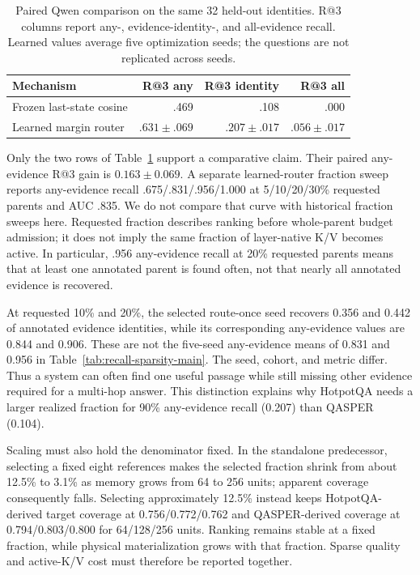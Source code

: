 \documentclass[11pt]{article}
\begin{document}
\begin{table}[H]
\centering
\small
\caption{Paired Qwen comparison on the same 32 held-out identities. R@3 columns report any-,
evidence-identity-, and all-evidence recall. Learned values average five optimization seeds;
the questions are not replicated across seeds.}
\label{tab:matched-routing-main}
\begin{tabular}{lrrr}
\toprule
Mechanism & R@3 any & R@3 identity & R@3 all \\
\midrule
Frozen last-state cosine & .469 & .108 & .000 \\
Learned margin router & $.631\pm.069$ & $.207\pm.017$ & $.056\pm.017$ \\
\bottomrule
\end{tabular}
\end{table}

Only the two rows of Table~\ref{tab:matched-routing-main} support a comparative claim. Their paired
any-evidence R@3 gain is $0.163\pm0.069$. A separate learned-router fraction sweep reports
any-evidence recall .675/.831/.956/1.000 at 5/10/20/30\% requested parents and AUC .835. We do not
compare that curve with historical fraction sweeps here. Requested fraction describes ranking
before whole-parent budget admission; it does not imply the same fraction of layer-native K/V
becomes active. In particular, .956 any-evidence recall at 20\% requested parents means that at
least one annotated parent is found often, not that nearly all annotated evidence is recovered.

At requested 10\% and 20\%, the selected route-once seed recovers 0.356 and 0.442 of annotated
evidence identities, while its corresponding any-evidence values are 0.844 and 0.906. These are
not the five-seed any-evidence means of 0.831 and 0.956 in Table~\ref{tab:recall-sparsity-main}.
The seed, cohort, and metric differ. Thus a
system can often find one useful passage while still missing other evidence required for a
multi-hop answer. This distinction explains why HotpotQA needs a larger realized fraction for
90\% any-evidence recall (0.207) than QASPER (0.104).

Scaling must also hold the denominator fixed. In the standalone predecessor, selecting a fixed
eight references makes the selected fraction shrink from about 12.5\% to 3.1\% as memory grows
from 64 to 256 units; apparent coverage consequently falls. Selecting approximately 12.5\%
instead keeps HotpotQA-derived target coverage at 0.756/0.772/0.762 and QASPER-derived coverage
at 0.794/0.803/0.800 for 64/128/256 units. Ranking remains stable at a fixed fraction, while
physical materialization grows with that fraction. Sparse quality and active-K/V cost must
therefore be reported together.
\end{document}
